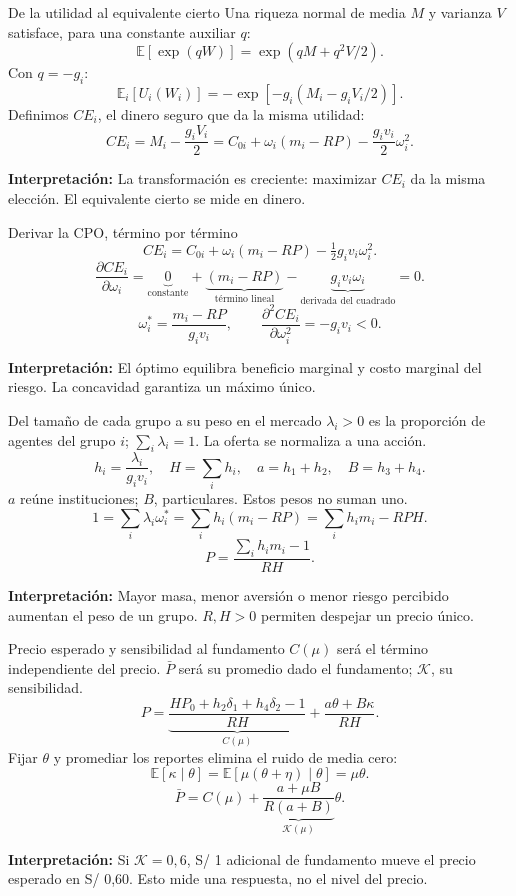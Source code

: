 \documentclass[aspectratio=169,11pt]{beamer}
\newcommand{\E}{\mathbb E}
\newcommand{\K}{\mathcal K}
\newcommand{\idea}[1]{\par\medskip\textbf{Interpretación:} #1}
\begin{document}
\begin{frame}{De la utilidad al equivalente cierto}
\small
Una riqueza normal de media \(M\) y varianza \(V\) satisface, para
una constante auxiliar \(q\):
\[
\E[\exp(qW)]=\exp(qM+q^2V/2).
\]
Con \(q=-g_i\):
\[
\E_i[U_i(W_i)]=-\exp[-g_i(M_i-g_iV_i/2)].
\]
Definimos \(CE_i\), el dinero seguro que da la misma utilidad:
\[
CE_i=M_i-\frac{g_iV_i}{2}
=C_{0i}+\omega_i(m_i-RP)-\frac{g_iv_i}{2}\omega_i^2.
\]
\normalsize
\idea{La transformación es creciente: maximizar \(CE_i\) da la misma elección.
El equivalente cierto se mide en dinero.}
\end{frame}

\begin{frame}{Derivar la CPO, término por término}
\[
 CE_i=C_{0i}+\omega_i(m_i-RP)-\tfrac12g_iv_i\omega_i^2.
\]
\[
 \frac{\partial CE_i}{\partial\omega_i}
 =\underbrace{0}_{\text{constante}}
 +\underbrace{(m_i-RP)}_{\text{término lineal}}
 -\underbrace{g_iv_i\omega_i}_{\text{derivada del cuadrado}}=0.
\]
\[
 \boxed{\omega_i^*=\frac{m_i-RP}{g_iv_i}},\qquad
 \frac{\partial^2 CE_i}{\partial\omega_i^2}=-g_iv_i<0.
\]
\idea{El óptimo equilibra beneficio marginal y costo marginal del riesgo.
La concavidad garantiza un máximo único.}
\end{frame}

\begin{frame}{Del tamaño de cada grupo a su peso en el mercado}
\(\lambda_i>0\) es la proporción de agentes del grupo \(i\);
\(\sum_i\lambda_i=1\). La oferta se normaliza a una acción.
\[
h_i=\frac{\lambda_i}{g_iv_i},\quad H=\sum_i h_i,\quad
a=h_1+h_2,\quad B=h_3+h_4.
\]
\(a\) reúne instituciones; \(B\), particulares. Estos pesos no suman uno.
\[
1=\sum_i\lambda_i\omega_i^*=\sum_i h_i(m_i-RP)
  =\sum_i h_im_i-RPH.
\]
\[
\boxed{P=\frac{\sum_i h_im_i-1}{RH}}.
\]
\idea{Mayor masa, menor aversión o menor riesgo percibido aumentan el peso
de un grupo. \(R,H>0\) permiten despejar un precio único.}
\end{frame}

\begin{frame}{Precio esperado y sensibilidad al fundamento}
\small
\(C(\mu)\) será el término independiente del precio.
\(\bar P\) será su promedio dado el fundamento; \(\K\), su sensibilidad.
\[
P=\underbrace{\frac{HP_0+h_2\delta_1+h_4\delta_2-1}{RH}}_{C(\mu)}
 +\frac{a\theta+B\kappa}{RH}.
\]
Fijar \(\theta\) y promediar los reportes elimina el ruido de media cero:
\[
\E[\kappa\mid\theta]=\E[\mu(\theta+\eta)\mid\theta]=\mu\theta.
\]
\[
\bar P=C(\mu)+\underbrace{\frac{a+\mu B}{R(a+B)}}_{\K(\mu)}\theta.
\]
\normalsize
\idea{Si \(\K=0{,}6\), S/ 1 adicional de fundamento mueve el precio esperado
en S/ 0,60. Esto mide una respuesta, no el nivel del precio.}
\end{frame}
\end{document}
